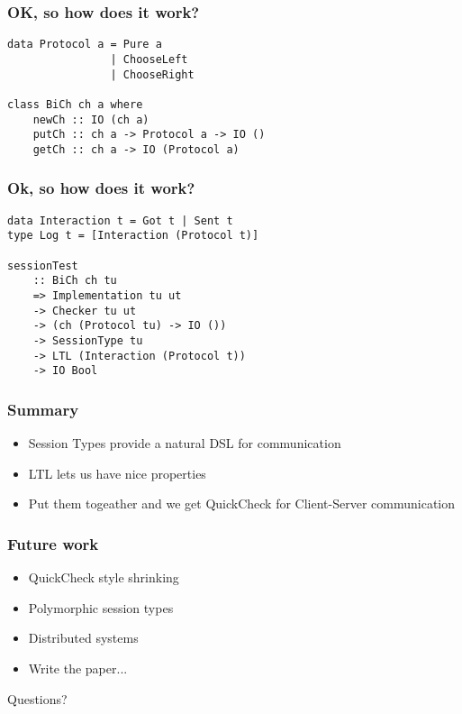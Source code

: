 \documentclass{beamer}
\begin{document}
\begin{frame}[fragile]
    \frametitle{OK, so how does it work?}
    \begin{verbatim}
data Protocol a = Pure a
                | ChooseLeft
                | ChooseRight

class BiCh ch a where
    newCh :: IO (ch a)
    putCh :: ch a -> Protocol a -> IO ()
    getCh :: ch a -> IO (Protocol a)
    \end{verbatim}
\end{frame}

\begin{frame}[fragile]
    \frametitle{Ok, so how does it work?}
    \begin{verbatim}
data Interaction t = Got t | Sent t
type Log t = [Interaction (Protocol t)]

sessionTest
    :: BiCh ch tu
    => Implementation tu ut
    -> Checker tu ut
    -> (ch (Protocol tu) -> IO ())
    -> SessionType tu
    -> LTL (Interaction (Protocol t))
    -> IO Bool
    \end{verbatim}
\end{frame}

\begin{frame}
    \frametitle{Summary}
    \begin{itemize}
        \item Session Types provide a natural DSL for communication
        \item LTL lets us have nice properties
        \item Put them togeather and we get QuickCheck for Client-Server communication
    \end{itemize}
\end{frame}

\begin{frame}
    \frametitle{Future work}
    \begin{itemize}
        \item QuickCheck style shrinking
        \item Polymorphic session types
        \item Distributed systems
        \item Write the paper...
    \end{itemize}
\end{frame}
\begin{frame}
    \Huge{\centerline{Questions?}}
\end{frame}
\end{document}
